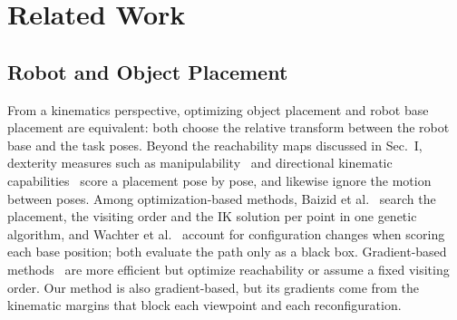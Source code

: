 \documentclass[letterpaper, journal, twoside]{IEEEtran}
\begin{document}
\section{Related Work}
\subsection{Robot and Object Placement}
From a kinematics perspective, optimizing object placement and robot base placement are equivalent: both choose the relative transform between the robot base and the task poses. Beyond the reachability maps discussed in Sec.~I, dexterity measures such as manipulability~\cite{yoshikawa1985manipulability} and directional kinematic capabilities~\cite{stradovnik2024} score a placement pose by pose, and likewise ignore the motion between poses. Among optimization-based methods, Baizid et al.~\cite{baizid2015} search the placement, the visiting order and the IK solution per point in one genetic algorithm, and Wachter et al.~\cite{wachter2024placement} account for configuration changes when scoring each base position; both evaluate the path only as a black box. Gradient-based methods~\cite{mayer2026smart,bstar2025} are more efficient but optimize reachability or assume a fixed visiting order. Our method is also gradient-based, but its gradients come from the kinematic margins that block each viewpoint and each reconfiguration.
\end{document}
